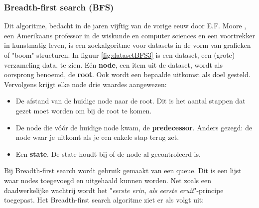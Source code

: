 \subsubsection{Breadth-first search (BFS)}
Dit algoritme, bedacht in de jaren vijftig van de vorige eeuw door E.F. Moore \cite{Moore}, een Amerikaans professor in de wiskunde en computer sciences en een voortrekker in kunstmatig leven, is een zoekalgoritme voor datasets in de vorm van grafieken of "boom"-structuren. In figuur \ref{fig:datasetBFS3} is een dataset, een (grote) verzameling data, te zien. E\'en \textbf{node}, een item uit de dataset, wordt als oorsprong benoemd, de \textbf{root}. Ook wordt een bepaalde uitkomst als doel gesteld. Vervolgens krijgt elke node drie waardes aangewezen:
\begin{itemize}
\item De afstand van de huidige node naar de root. Dit is het aantal stappen dat gezet moet worden om bij de root te komen. 
\item De node die v\'{o}\'{o}r de huidige node kwam, de \textbf{predecessor}. Anders gezegd: de node waar je uitkomt als je een enkele stap terug zet.
\item Een \textbf{state}. De state houdt bij of de node al gecontroleerd is.
\end{itemize}

Bij Breadth-first search wordt gebruik gemaakt van een queue. Dit is een lijst waar nodes toegevoegd en uitgehaald kunnen worden. Net zoals een daadwerkelijke wachtrij wordt het "\textit{eerste erin, als eerste eruit}"-principe toegepast.
Het Breadth-first search algoritme ziet er als volgt uit:


